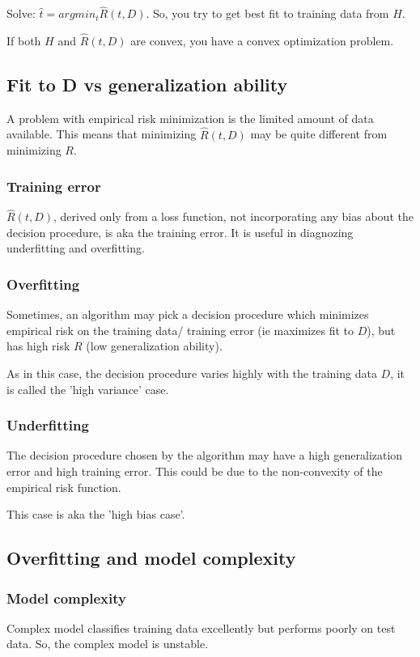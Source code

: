 \documentclass[oneside, article]{memoir}
\begin{document}
Solve: $\hat{t} = argmin_t \hat{R}(t, D)$. So, you try to get best fit to training data from $H$.

If both $H$ and $\hat{R}(t, D)$ are convex, you have a convex optimization problem.

\subsection{Fit to D vs generalization ability}
A problem with empirical risk minimization is the limited amount of data available. This means that minimizing $\hat{R}(t, D)$ may be quite different from minimizing $R$.

\subsubsection{Training error}
$\hat{R}(t, D)$, derived only from a loss function, not incorporating any bias about the decision procedure, is aka the training error. It is useful in diagnozing underfitting and overfitting.

\subsubsection{Overfitting}
Sometimes, an algorithm may pick a decision procedure which minimizes empirical risk on the training data/ training error (ie maximizes fit to $D$), but has high risk $R$ (low generalization ability).

As in this case, the decision procedure varies highly with the training data $D$, it is called the 'high variance' case.

\subsubsection{Underfitting}
The decision procedure chosen by the algorithm may have a high generalization error and high training error. This could be due to the non-convexity of the empirical risk function.

This case is aka the 'high bias case'.


\subsection{Overfitting and model complexity}
\subsubsection{Model complexity}
Complex model classifies training data excellently but performs poorly on test data. So, the complex model is unstable.
\end{document}
